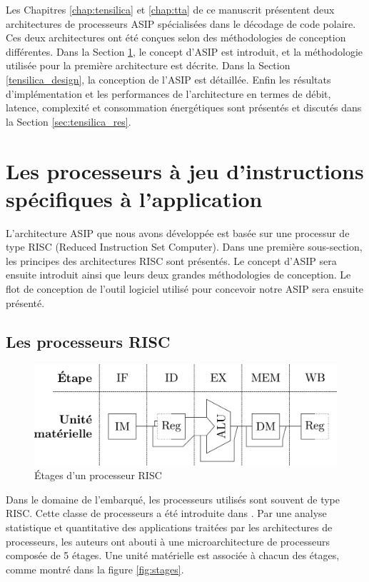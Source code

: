 Les Chapitres \ref{chap:tensilica} et \ref{chap:tta} de ce manuscrit présentent deux architectures de processeurs ASIP spécialisées dans le décodage de code polaire. Ces deux architectures ont été conçues selon des méthodologies de conception différentes. Dans la Section \ref{sec:asips}, le concept d'ASIP est introduit, et la méthodologie utilisée pour la première architecture est décrite. Dans la Section \ref{tensilica_design}, la conception de l'ASIP est détaillée. Enfin les résultats d'implémentation et les performances de l'architecture en termes de débit, latence, complexité et consommation énergétiques sont présentés et discutés dans la Section \ref{sec:tensilica_res}.


\section{Les processeurs à jeu d'instructions spécifiques à l'application}
\label{sec:asips}

L'architecture ASIP que nous avons développée est basée sur une processur de type RISC (Reduced Instruction Set Computer). Dans une première sous-section, les principes des architectures RISC sont présentés. Le concept d'ASIP sera ensuite introduit ainsi que leurs deux grandes méthodologies de conception. Le flot de conception de l'outil logiciel utilisé pour concevoir notre ASIP sera ensuite présenté.

\subsection{Les processeurs RISC}

\begin{figure}[t]
\centering
\includegraphics[width=\textwidth]{main/ch3_fig/stages}
\caption{\'Etages d'un processeur RISC}
\end{figure}

Dans le domaine de l'embarqué, les processeurs utilisés sont souvent de type RISC. Cette classe de processeurs a été introduite dans \cite{hennessy2011computer}. Par une analyse statistique et quantitative des applications traitées par les architectures de processeurs, les auteurs ont abouti à une microarchitecture de processeurs composée de 5 étages. Une unité matérielle est associée à chacun des étages, comme montré dans la figure \ref{fig:stages}.


